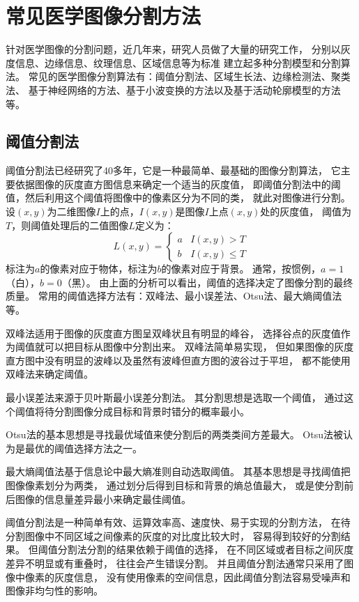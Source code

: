 \section{常见医学图像分割方法}%
针对医学图像的分割问题，近几年来，研究人员做了大量的研究工作，
分别以灰度信息、边缘信息、纹理信息、区域信息等为标准
建立起多种分割模型和分割算法。
常见的医学图像分割算法有：阈值分割法、区域生长法、边缘检测法、聚类法、
基于神经网络的方法、基于小波变换的方法以及基于活动轮廓模型的方法等。

\subsection{阈值分割法}
阈值分割法已经研究了40多年，它是一种最简单、最基础的图像分割算法，
它主要依据图像的灰度直方图信息来确定一个适当的灰度值，
即阈值分割法中的阈值，然后利用这个阈值将图像中的像素区分为不同的类，
就此对图像进行分割。
设$(x,y)$为二维图像$I$上的点，$I(x,y)$是图像$I$上点$(x,y)$处的灰度值，
阈值为$T$，则阈值处理后的二值图像$L$定义为：
\begin{equation}
  L(x,y)=
  \begin{cases}
    a& I(x,y)>T\\
    b& I(x,y)\le T
  \end{cases}
\end{equation}
标注为$a$的像素对应于物体，标注为$b$的像素对应于背景。
通常，按惯例，$a=1$（白），$b=0$（黑）。
由上面的分析可以看出，阈值的选择决定了图像分割的最终质量。
常用的阈值选择方法有：双峰法、最小误差法、Otsu法、最大熵阈值法等。

双峰法适用于图像的灰度直方图呈双峰状且有明显的峰谷，
选择谷点的灰度值作为阈值就可以把目标从图像中分割出来。
双峰法简单易实现，
但如果图像的灰度直方图中没有明显的波峰以及虽然有波峰但直方图的波谷过于平坦，
都不能使用双峰法来确定阈值。

最小误差法来源于贝叶斯最小误差分割法。
其分割思想是选取一个阈值，
通过这个阈值将待分割图像分成目标和背景时错分的概率最小。

Otsu法的基本思想是寻找最优域值来使分割后的两类类间方差最大。
Otsu法被认为是最优的阈值选择方法之一。

最大熵阈值法基于信息论中最大熵准则自动选取阈值。
其基本思想是寻找阈值把图像像素划分为两类，
通过划分后得到目标和背景的熵总值最大，
或是使分割前后图像的信息量差异最小来确定最佳阈值。

阈值分割法是一种简单有效、运算效率高、速度快、易于实现的分割方法，
在待分割图像中不同区域之间像素的灰度的对比度比较大时，
容易得到较好的分割结果。
但阈值分割法分割的结果依赖于阈值的选择，
在不同区域或者目标之间灰度差异不明显或有重叠时，
往往会产生错误分割。
并且阈值分割法通常只采用了图像中像素的灰度信息，
没有使用像素的空间信息，因此阈值分割法容易受噪声和图像非均匀性的影响。

